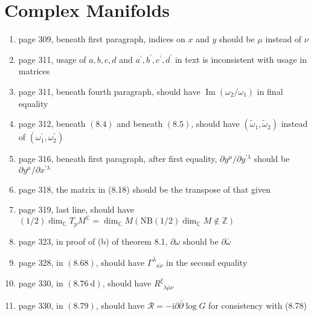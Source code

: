 \documentclass{article}
\begin{document}
\section*{Complex Manifolds}

\begin{enumerate}
  
\item page 309, beneath first paragraph, indices on $x$ and $y$ should be $\mu$ instead of $\nu$

\item page 311, usage of $a, b, c, d$ and $a^{\prime}, b^{\prime}, c^{\prime}, d^{\prime}$ in text is inconsistent with usage in matrices

\item page 311, beneath fourth paragraph, should have $\operatorname{Im}\left(\omega_{2} / \omega_{1}\right)$ in final equality

\item page 312, beneath $(8.4)$ and beneath $(8.5)$, should have $\left(\tilde{\omega}_{1}, \tilde{\omega}_{2}\right)$ instead of $\left(\omega_{1}^{\prime}, \omega_{2}^{\prime}\right)$

\item page 316, beneath first paragraph, after first equality, $\partial y^{\mu} / \partial y^{\prime \lambda}$ should be $\partial y^{\mu} / \partial x^{\prime \lambda}$

\item page 318, the matrix in (8.18) should be the transpose of that given

\item page 319, last line, should have $(1 / 2) \operatorname{dim}_{\mathbb{C}} T_{p} M^{\mathbb{C}}=\operatorname{dim}_{\mathbb{C}} M\left(\mathrm{NB}(1 / 2) \operatorname{dim}_{\mathbb{C}} M \notin \mathbb{Z}\right)$

\item page 323, in proof of (b) of theorem 8.1, $\partial \omega$ should be $\partial \bar{\omega}$

\item page 328, in $(8.68)$, should have $\Gamma^{\bar{\lambda}}{}_{\overline{\kappa \nu}}$ in the second equality

\item page 330, in $(8.76 \mathrm{~d})$, should have $R^{\bar{\xi}}{}_{ \bar{\lambda} \bar{\mu} \nu}$

\item page 330, in $(8.79)$, should have $\mathcal{R}=-\mathrm{i} \partial \bar{\partial} \log G$ for consistency with (8.78)


\end{enumerate}
\end{document}
